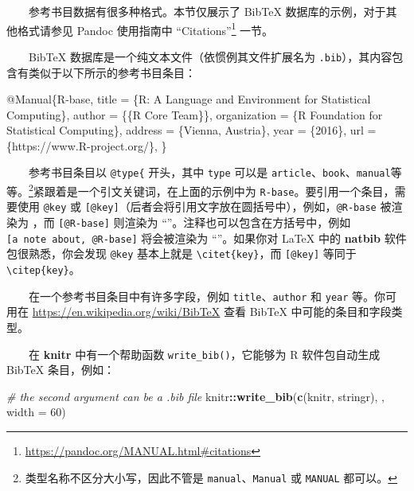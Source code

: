 \documentclass[
  12pt,
]{krantz}
\newenvironment{Shaded}{\begin{snugshade}}{\end{snugshade}}
\newcommand{\AttributeTok}[1]{\textcolor[rgb]{0.13,0.29,0.53}{#1}}
\newcommand{\CommentTok}[1]{\textcolor[rgb]{0.56,0.35,0.01}{\textit{#1}}}
\newcommand{\DataTypeTok}[1]{\textcolor[rgb]{0.13,0.29,0.53}{#1}}
\newcommand{\DecValTok}[1]{\textcolor[rgb]{0.00,0.00,0.81}{#1}}
\newcommand{\FunctionTok}[1]{\textcolor[rgb]{0.13,0.29,0.53}{\textbf{#1}}}
\newcommand{\NormalTok}[1]{#1}
\newcommand{\OtherTok}[1]{\textcolor[rgb]{0.56,0.35,0.01}{#1}}
\newcommand{\SpecialCharTok}[1]{\textcolor[rgb]{0.81,0.36,0.00}{\textbf{#1}}}
\newcommand{\StringTok}[1]{\textcolor[rgb]{0.31,0.60,0.02}{#1}}
\newcommand{\VariableTok}[1]{\textcolor[rgb]{0.00,0.00,0.00}{#1}}
\renewcommand{\href}[2]{#2\footnote{\url{#1}}}
\theoremstyle{definition}
\theoremstyle{definition}
\theoremstyle{definition}
\theoremstyle{definition}
\theoremstyle{remark}
\begin{document}
  参考书目数据有很多种格式。本节仅展示了 BibTeX 数据库的示例，对于其他格式请参见 Pandoc 使用指南中 \href{https://pandoc.org/MANUAL.html\#citations}{``Citations''} 一节。

  BibTeX 数据库是一个纯文本文件（依惯例其文件扩展名为 \texttt{.bib}），其内容包含有类似于以下所示的参考书目条目：

\begin{Shaded}
\begin{Highlighting}[]
\VariableTok{@Manual}\NormalTok{\{}\OtherTok{R}\NormalTok{{-}}\OtherTok{base}\NormalTok{,}
  \DataTypeTok{title}\NormalTok{ = \{R: A Language and Environment for Statistical}
\NormalTok{    Computing\},}
  \DataTypeTok{author}\NormalTok{ = \{\{R Core Team\}\},}
  \DataTypeTok{organization}\NormalTok{ = \{R Foundation for Statistical Computing\},}
  \DataTypeTok{address}\NormalTok{ = \{Vienna, Austria\},}
  \DataTypeTok{year}\NormalTok{ = \{2016\},}
  \DataTypeTok{url}\NormalTok{ = \{https://www.R{-}project.org/\},}
\NormalTok{\}}
\end{Highlighting}
\end{Shaded}

  参考书目条目以 \texttt{@type\{} 开头，其中 \texttt{type} 可以是 \texttt{article}、\texttt{book}、\texttt{manual}等等。\footnote{类型名称不区分大小写，因此不管是 \texttt{manual}、\texttt{Manual} 或 \texttt{MANUAL} 都可以。}紧跟着是一个引文关键词，在上面的示例中为 \texttt{R-base}。要引用一个条目，需要使用 \texttt{@key} 或 \texttt{{[}@key{]}}（后者会将引用文字放在圆括号中），例如，\texttt{@R-base} 被渲染为 \citet{R-base}，而 \texttt{{[}@R-base{]}} 则渲染为 ``\citep{R-base}''。注释也可以包含在方括号中，例如 \texttt{{[}a\ note\ about,\ @R-base{]}} 将会被渲染为 ``\citep[a note about,][]{R-base}''。如果你对 LaTeX 中的 \textbf{natbib} 软件包很熟悉，你会发现 \texttt{@key} 基本上就是 \texttt{\textbackslash{}citet\{key\}}，而 \texttt{{[}@key{]}} 等同于 \texttt{\textbackslash{}citep\{key\}}。

  在一个参考书目条目中有许多字段，例如 \texttt{title}、\texttt{author} 和 \texttt{year} 等。你可用在 \url{https://en.wikipedia.org/wiki/BibTeX} 查看 BibTeX 中可能的条目和字段类型。

  在 \textbf{knitr} 中有一个帮助函数 \texttt{write\_bib()}，它能够为 R 软件包自动生成 BibTeX 条目，例如：

\begin{Shaded}
\begin{Highlighting}[]
\CommentTok{\# the second argument can be a .bib file}
\NormalTok{knitr}\SpecialCharTok{::}\FunctionTok{write\_bib}\NormalTok{(}\FunctionTok{c}\NormalTok{(}\StringTok{\textquotesingle{}knitr\textquotesingle{}}\NormalTok{, }\StringTok{\textquotesingle{}stringr\textquotesingle{}}\NormalTok{), }\StringTok{\textquotesingle{}\textquotesingle{}}\NormalTok{, }\AttributeTok{width =} \DecValTok{60}\NormalTok{)}
\end{Highlighting}
\end{Shaded}
\end{document}
